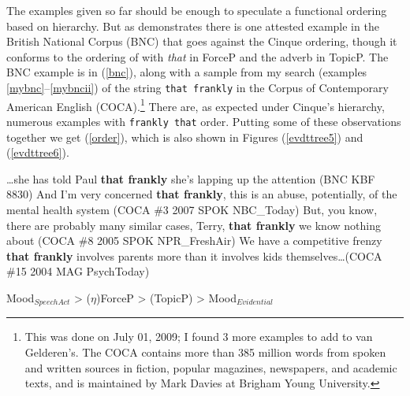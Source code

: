\documentclass[11pt]{article}
\begin{document}
The examples given so far should be enough to speculate a functional ordering based on  hierarchy. But as \cite{vangelderen05cpsplit} demonstrates there is one attested example in the British National Corpus (BNC) that goes against the Cinque ordering, though it conforms to the ordering of \cite{rizzi97fine} with {\sl that} in ForceP and the adverb in TopicP. The BNC example is in (\ref{bnc}), along with a sample from my search (examples \ref{mybnc}--\ref{mybncii}) of the string \texttt{that frankly} in the Corpus of Contemporary American English (COCA).\footnote{This was done on July 01, 2009; I found 3 more examples to add to van Gelderen's. The COCA contains more than 385 million words from spoken and written sources in fiction, popular magazines, newspapers, and academic texts, and is maintained by Mark Davies at Brigham Young University.} There are, as expected under Cinque's hierarchy, numerous examples with \texttt{frankly that} order. Putting some of these observations together we get (\ref{order}), which is also shown in Figures (\ref{evdttree5}) and (\ref{evdttree6}).
 
\begin{exe}
\ex \ldots she has told Paul {\bf that frankly} she's lapping up the attention (BNC KBF 8830)\label{bnc}
\ex And I'm very concerned {\bf that frankly}, this is an abuse, potentially, of the mental health system (COCA \#3 2007 SPOK NBC\_Today)\label{mybnc}
\ex But, you know, there are probably many similar cases, Terry, {\bf that frankly} we know nothing about (COCA \#8 2005 SPOK NPR\_FreshAir)\label{mybnci}
\ex We have a competitive frenzy {\bf that frankly} involves parents more than it involves kids themselves\ldots (COCA \#15 2004 MAG PsychToday)\label{mybncii}
\end{exe}

\begin{exe}
\ex Mood$_{Speech Act}$ \textgreater{} ($\eta$)ForceP \textgreater{} (TopicP) \textgreater{} Mood$_{Evidential}$\label{order}
\end{exe}
% 
% 
\end{document}

